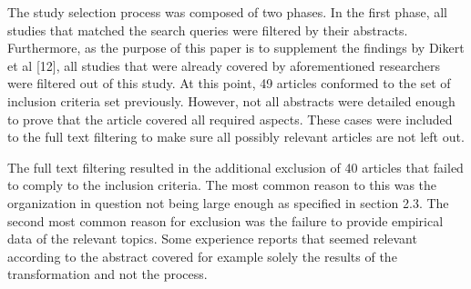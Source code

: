The study selection process was composed of two phases. In the first
phase, all studies that matched the search queries were filtered by
their abstracts. Furthermore, as the purpose of this paper is to
supplement the findings by Dikert et al [12], all studies that were
already covered by aforementioned researchers were filtered out of
this study. At this point, 49 articles conformed to the set of inclusion
criteria set previously. However, not all abstracts were detailed enough
to prove that the article covered all required aspects. These cases were
included to the full text filtering to make sure all possibly relevant
articles are not left out.

The full text filtering resulted in the additional exclusion of 40
articles that failed to comply to the inclusion criteria. The most
common reason to this was the organization in question not being large
enough as specified in section 2.3. The second most common reason for
exclusion was the failure to provide empirical data of the relevant
topics. Some experience reports that seemed relevant according to the
abstract covered for example solely the results of the transformation
and not the process.
